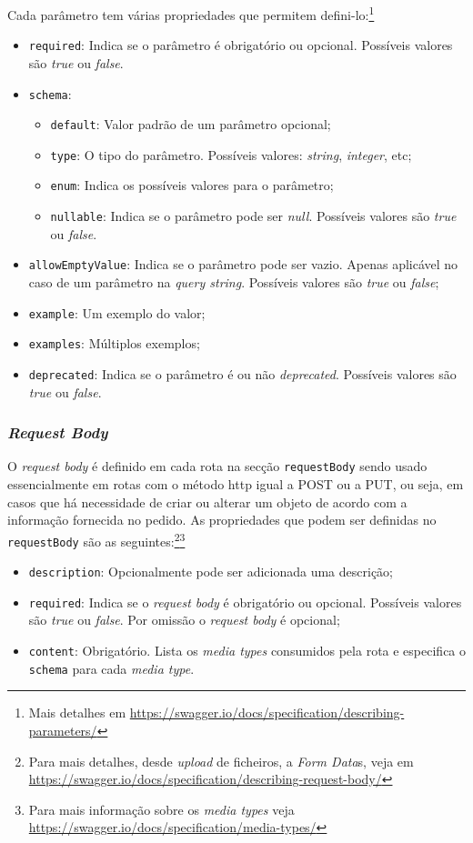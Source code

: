Cada parâmetro tem várias propriedades que permitem defini-lo:\footnote{Mais detalhes em \url{https://swagger.io/docs/specification/describing-parameters/}}
\begin{itemize}
    \item \texttt{required}: Indica se o parâmetro é obrigatório ou opcional. 
    Possíveis valores são \textit{true} ou \textit{false}.
    \item \texttt{schema}:
    \begin{itemize}
        \item \texttt{default}: Valor padrão de um parâmetro opcional;
        \item \texttt{type}: O tipo do parâmetro. Possíveis valores: \textit{string}, \textit{integer}, etc;
        \item \texttt{enum}: Indica os possíveis valores para o parâmetro;
        \item \texttt{nullable}: Indica se o parâmetro pode ser \textit{null}. Possíveis valores são 
        \textit{true} ou \textit{false}.
    \end{itemize}
    \item \texttt{allowEmptyValue}: Indica se o parâmetro pode ser vazio. Apenas aplicável no caso de um 
    parâmetro na \textit{query string}. Possíveis valores são \textit{true} ou \textit{false};
    \item \texttt{example}: Um exemplo do valor;
    \item \texttt{examples}: Múltiplos exemplos;
    \item \texttt{deprecated}: Indica se o parâmetro é ou não \textit{deprecated}. Possíveis valores são 
    \textit{true} ou \textit{false}.
\end{itemize}

\subsubsection{\textit{Request Body}}
O \textit{request body} é definido em cada rota na secção \texttt{requestBody} sendo usado essencialmente em 
rotas com o método \acrshort{http} igual a POST ou a PUT, ou seja, em casos que há necessidade de criar ou alterar 
um objeto de acordo com a informação fornecida no pedido. As propriedades que podem ser definidas no 
\texttt{requestBody} são as seguintes:\footnote{Para mais detalhes, desde \textit{upload} de ficheiros, a \textit{Form Data}s, veja em \url{https://swagger.io/docs/specification/describing-request-body/}}\footnote{Para mais informação sobre os \textit{media types} veja \url{https://swagger.io/docs/specification/media-types/}}
\begin{itemize}
    \item \texttt{description}: Opcionalmente pode ser adicionada uma descrição;
    \item \texttt{required}: Indica se o \textit{request body} é obrigatório ou opcional. 
    Possíveis valores são \textit{true} ou \textit{false}. Por omissão o \textit{request body} é opcional;
    \item \texttt{content}: Obrigatório. Lista os \textit{media types} consumidos pela rota e especifica 
    o \texttt{schema} para cada \textit{media type}.
\end{itemize}

